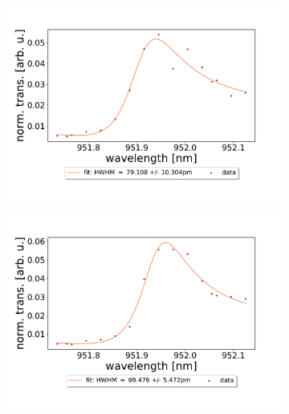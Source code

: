 \begin{figure}[h!]
\begin{subfigure}[b]{0.49\textwidth}
        \includegraphics[width=\textwidth]{figures/results/double fano fits/20250326/453um_M3:M5_fit_3.pdf}
        \caption{}
        \label{fig:453um_M3:M5_fit_3}
    \end{subfigure}
    \begin{subfigure}[b]{0.49\textwidth}
        \includegraphics[width=\textwidth]{figures/results/double fano fits/20250326/453um_M3:M5_fit_4.pdf}
        \caption{}
        \label{fig:453um_M3:M5_fit_4}
    \end{subfigure}
    \begin{subfigure}[b]{0.49\textwidth}

\end{subfigure}
\end{figure}
